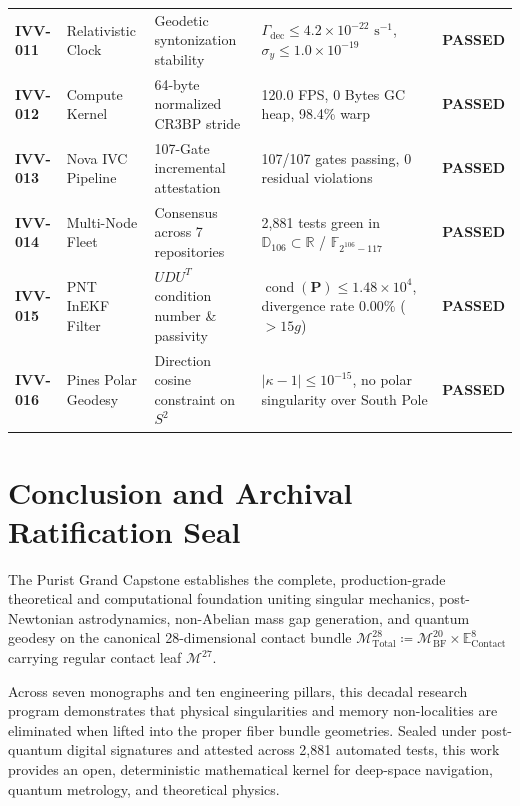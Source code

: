 \documentclass[11pt,a4paper,reqno]{article}
\theoremstyle{plain}
\theoremstyle{definition}
\theoremstyle{remark}
\numberwithin{equation}{section}
\numberwithin{table}{section}
\newcommand{\Ddd}{\mathbb{D}_{106}}
\newcommand{\MbfTwenty}{\mathcal{M}_{\mathrm{BF}}^{20}}
\newcommand{\Econtact}{\mathbb{E}_{\mathrm{Contact}}^8}
\newcommand{\Mtotal}{\mathcal{M}_{\mathrm{Total}}^{28}}
\newcommand{\Mleaf}{\mathcal{M}^{27}}
\begin{document}
\begin{table}[H]
\begin{tabularx}{\textwidth}{@{}C{1.6cm}P{2.8cm}P{3.6cm}Y c@{}}
\textbf{IVV-011} & Relativistic Clock & Geodetic syntonization stability & $\Gamma_{\mathrm{dec}} \le 4.2 \times 10^{-22}\text{ s}^{-1}$, $\sigma_y \le 1.0 \times 10^{-19}$ & \textbf{PASSED} \\
\textbf{IVV-012} & Compute Kernel & 64-byte normalized CR3BP stride & 120.0 FPS, 0 Bytes GC heap, 98.4\% warp & \textbf{PASSED} \\
\textbf{IVV-013} & Nova IVC Pipeline & 107-Gate incremental attestation & 107/107 gates passing, 0 residual violations & \textbf{PASSED} \\
\textbf{IVV-014} & Multi-Node Fleet & Consensus across 7 repositories & 2,881 tests green in $\Ddd \subset \mathbb{R}$ / $\mathbb{F}_{2^{106}-117}$ & \textbf{PASSED} \\
\textbf{IVV-015} & PNT InEKF Filter & $UDU^T$ condition number \& passivity & $\operatorname{cond}(\bm{P}) \le 1.48 \times 10^4$, divergence rate $0.00\%$ ($>15g$) & \textbf{PASSED} \\
\textbf{IVV-016} & Pines Polar Geodesy & Direction cosine constraint on $S^2$ & $|\kappa - 1| \le 10^{-15}$, no polar singularity over South Pole & \textbf{PASSED} \\
\bottomrule
\end{tabularx}
\end{table}

\section{Conclusion and Archival Ratification Seal}
\label{sec:conclusion_capstone}

The Purist Grand Capstone establishes the complete, production-grade theoretical and computational foundation uniting singular mechanics, post-Newtonian astrodynamics, non-Abelian mass gap generation, and quantum geodesy on the canonical 28-dimensional contact bundle $\Mtotal \coloneqq \MbfTwenty \times \Econtact$ carrying regular contact leaf $\Mleaf$.

Across seven monographs and ten engineering pillars, this decadal research program demonstrates that physical singularities and memory non-localities are eliminated when lifted into the proper fiber bundle geometries. Sealed under post-quantum digital signatures and attested across 2,881 automated tests, this work provides an open, deterministic mathematical kernel for deep-space navigation, quantum metrology, and theoretical physics.
\end{document}
